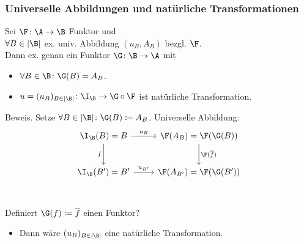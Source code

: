 \begin{frame}[fragile]
  \frametitle{Universelle Abbildungen und natürliche Transformationen}
  \begin{thm*}
    Sei $\F \colon \A \to \B$ Funktor und \\
    $\forall B \in |\B|$ ex. univ. Abbildung $(u_B, A_B)$ bezgl. $\F$. \\
    Dann ex. genau ein Funktor $\G \colon \B \to \A$ mit
    \pause
    \begin{itemize}
      \item $\forall B \in \B \colon \G(B) = A_B$.
      \item $u = (u_B)_{B \in |\B|} \colon \I_\B \to \G \circ \F$ ist natürliche Transformation.
    \end{itemize}
  \end{thm*}
  \pause

  \begin{block}{Beweis.}
  Setze $\forall B \in |\B| \colon \G(B) \coloneqq A_B$. Universelle Abbildung:
    \pause
    $$
    \begin{tikzcd}[row sep=2.5em]
      \I_\B(B)  = B \arrow[r,"u_B"] \arrow[d,"f"'] & \F(A_B)     = \F(\G(B)) \arrow[d,"\F(\overline f)"] 
      \\ 
      \I_\B(B') = B'\arrow[r,"u_{B'}"]              & \F(A_{B'})  = \F(\G(B')) \\
    \end{tikzcd}
    $$
    \pause
    Definiert $\G(f) \coloneqq \overline f$ einen Funktor? 
    \begin{itemize}
      \item Dann w\"are $(u_B)_{B \in |\B|}$ eine nat\"urliche Transformation.
    \end{itemize}
  \end{block}
\end{frame}

